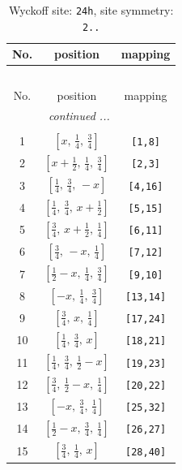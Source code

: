 \documentclass[fleqn,8pt]{jsarticle}
\begin{document}
\begin{longtable}{ccc}
\caption{Wyckoff site: {\tt 24h}, site symmetry: {\tt 2..}}
 \\
 \hline \hline
No. & position & mapping \\ \hline \endfirsthead

\multicolumn{2}{l}{\tablename\ \thetable{}} \\
 \hline \hline
No. & position & mapping \\ \hline \endhead

 \hline \hline
\multicolumn{2}{r}{\footnotesize\it continued ...} \\ \endfoot

 \hline \hline
\multicolumn{2}{r}{} \\ \endlastfoot

1 & $\left[ x,\, \frac{1}{4},\, \frac{3}{4} \right]$ & {\tt [1,8]} \\ \hline
2 & $\left[ x + \frac{1}{2},\, \frac{1}{4},\, \frac{3}{4} \right]$ & {\tt [2,3]} \\ \hline
3 & $\left[ \frac{1}{4},\, \frac{3}{4},\, - x \right]$ & {\tt [4,16]} \\ \hline
4 & $\left[ \frac{1}{4},\, \frac{3}{4},\, x + \frac{1}{2} \right]$ & {\tt [5,15]} \\ \hline
5 & $\left[ \frac{3}{4},\, x + \frac{1}{2},\, \frac{1}{4} \right]$ & {\tt [6,11]} \\ \hline
6 & $\left[ \frac{3}{4},\, - x,\, \frac{1}{4} \right]$ & {\tt [7,12]} \\ \hline
7 & $\left[ \frac{1}{2} - x,\, \frac{1}{4},\, \frac{3}{4} \right]$ & {\tt [9,10]} \\ \hline
8 & $\left[ - x,\, \frac{1}{4},\, \frac{3}{4} \right]$ & {\tt [13,14]} \\ \hline
9 & $\left[ \frac{3}{4},\, x,\, \frac{1}{4} \right]$ & {\tt [17,24]} \\ \hline
10 & $\left[ \frac{1}{4},\, \frac{3}{4},\, x \right]$ & {\tt [18,21]} \\ \hline
11 & $\left[ \frac{1}{4},\, \frac{3}{4},\, \frac{1}{2} - x \right]$ & {\tt [19,23]} \\ \hline
12 & $\left[ \frac{3}{4},\, \frac{1}{2} - x,\, \frac{1}{4} \right]$ & {\tt [20,22]} \\ \hline
13 & $\left[ - x,\, \frac{3}{4},\, \frac{1}{4} \right]$ & {\tt [25,32]} \\ \hline
14 & $\left[ \frac{1}{2} - x,\, \frac{3}{4},\, \frac{1}{4} \right]$ & {\tt [26,27]} \\ \hline
15 & $\left[ \frac{3}{4},\, \frac{1}{4},\, x \right]$ & {\tt [28,40]} \\ \hline

\end{longtable}
\end{document}
